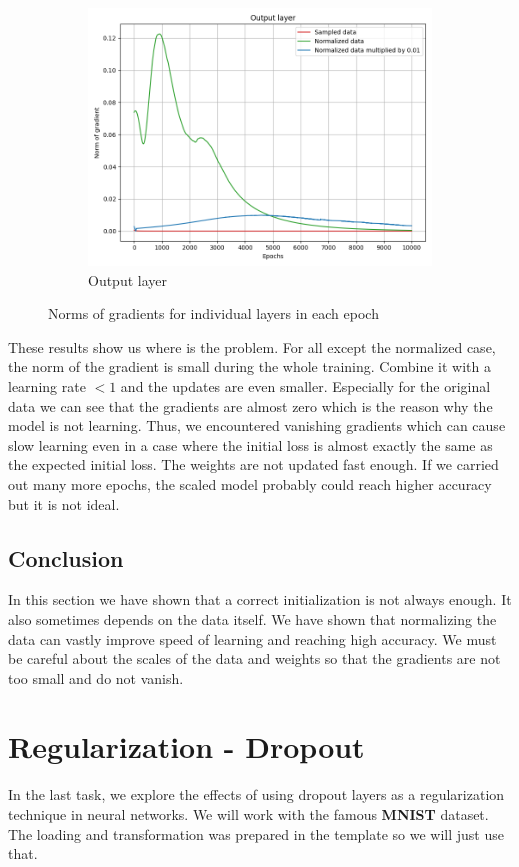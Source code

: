 \documentclass[a4paper,11pt]{article}
\begin{document}
\begin{figure}[ht]
\begin{subfigure}[b]{0.3\textwidth}
        \includegraphics[width=\textwidth]{../out/02_shallow/grad_out.png}
        \caption{Output layer}
    \end{subfigure}
    \hfill
    \caption{Norms of gradients for individual layers in each epoch}
    \label{fig:grad_norms}
\end{figure}

These results show us where is the problem.
For all except the normalized case, the norm of the gradient is small during the whole training.
Combine it with a learning rate $< 1$ and the updates are even smaller.
Especially for the original data we can see that the gradients are almost zero which is the reason why the model is not learning.
Thus, we encountered vanishing gradients which can cause slow learning even in a case where the initial loss is almost exactly the same as the expected initial loss.
The weights are not updated fast enough.
If we carried out many more epochs, the scaled model probably could reach higher accuracy but it is not ideal.

\subsection{Conclusion}
In this section we have shown that a correct initialization is not always enough.
It also sometimes depends on the data itself.
We have shown that normalizing the data can vastly improve speed of learning and reaching high accuracy.
We must be careful about the scales of the data and weights so that the gradients are not too small and do not vanish.

\section{Regularization - Dropout}
In the last task, we explore the effects of using dropout layers as a regularization technique in neural networks.
We will work with the famous \textbf{MNIST} dataset.
The loading and transformation was prepared in the template so we will just use that.
\end{document}
